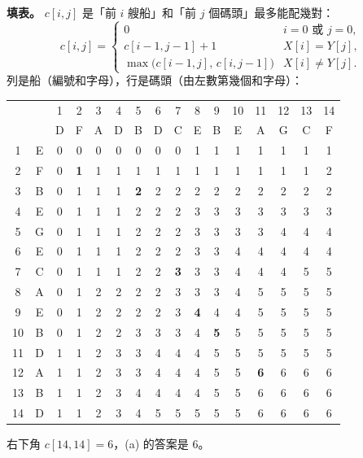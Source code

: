 \begin{pastsoln}
\textbf{填表。} $c[i, j]$ 是「前 $i$ 艘船」和「前 $j$ 個碼頭」最多能配幾對：
\[
c[i, j] =
\begin{cases}
0 & i = 0 \text{ 或 } j = 0,\\
c[i-1, j-1] + 1 & X[i] = Y[j],\\
\max\bigl(c[i-1, j],\, c[i, j-1]\bigr) & X[i] \ne Y[j].
\end{cases}
\]
列是船（編號和字母），行是碼頭（由左數第幾個和字母）：
\begin{center}
\footnotesize
\setlength{\tabcolsep}{3.2pt}
\begin{tabular}{cc|cccccccccccccc}
 & & 1 & 2 & 3 & 4 & 5 & 6 & 7 & 8 & 9 & 10 & 11 & 12 & 13 & 14 \\
 & & D & F & A & D & B & D & C & E & B & E & A & G & C & F \\ \hline
1 & E & 0 & 0 & 0 & 0 & 0 & 0 & 0 & 1 & 1 & 1 & 1 & 1 & 1 & 1 \\
2 & F & 0 & \textbf{1} & 1 & 1 & 1 & 1 & 1 & 1 & 1 & 1 & 1 & 1 & 1 & 2 \\
3 & B & 0 & 1 & 1 & 1 & \textbf{2} & 2 & 2 & 2 & 2 & 2 & 2 & 2 & 2 & 2 \\
4 & E & 0 & 1 & 1 & 1 & 2 & 2 & 2 & 3 & 3 & 3 & 3 & 3 & 3 & 3 \\
5 & G & 0 & 1 & 1 & 1 & 2 & 2 & 2 & 3 & 3 & 3 & 3 & 4 & 4 & 4 \\
6 & E & 0 & 1 & 1 & 1 & 2 & 2 & 2 & 3 & 3 & 4 & 4 & 4 & 4 & 4 \\
7 & C & 0 & 1 & 1 & 1 & 2 & 2 & \textbf{3} & 3 & 3 & 4 & 4 & 4 & 5 & 5 \\
8 & A & 0 & 1 & 2 & 2 & 2 & 2 & 3 & 3 & 3 & 4 & 5 & 5 & 5 & 5 \\
9 & E & 0 & 1 & 2 & 2 & 2 & 2 & 3 & \textbf{4} & 4 & 4 & 5 & 5 & 5 & 5 \\
10 & B & 0 & 1 & 2 & 2 & 3 & 3 & 3 & 4 & \textbf{5} & 5 & 5 & 5 & 5 & 5 \\
11 & D & 1 & 1 & 2 & 3 & 3 & 4 & 4 & 4 & 5 & 5 & 5 & 5 & 5 & 5 \\
12 & A & 1 & 1 & 2 & 3 & 3 & 4 & 4 & 4 & 5 & 5 & \textbf{6} & 6 & 6 & 6 \\
13 & B & 1 & 1 & 2 & 3 & 4 & 4 & 4 & 4 & 5 & 5 & 6 & 6 & 6 & 6 \\
14 & D & 1 & 1 & 2 & 3 & 4 & 5 & 5 & 5 & 5 & 5 & 6 & 6 & 6 & 6 \\
\end{tabular}
\end{center}
右下角 $c[14, 14] = 6$，(a) 的答案是 $6$。


\end{pastsoln}

